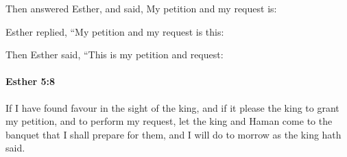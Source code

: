 			\begin{versebox}
					\item[BHS] 
					\item[LXX] 
					\item[ASV] Then answered Esther, and said, My petition and my request is:
					\item[NIV] Esther replied, “My petition and my request is this:
					\item[NRSV] Then Esther said, “This is my petition and request:
			\end{versebox}

		\paragraph{Esther 5:8} %
			\label{ESTHER-5-8}

			If I have found favour in the sight of the king, and if it please the king to grant my petition, and to perform my request, let the king and Haman come to the banquet that I shall prepare for them, and I will do to morrow as the king hath said.

